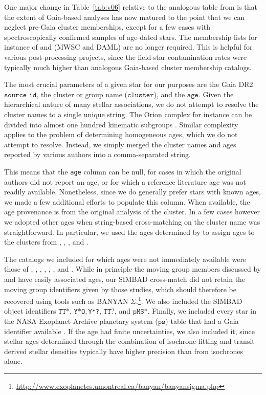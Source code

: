 \documentclass[12pt,modern,twocolumn,tighten]{aastex63}
\begin{document}
One major change in Table~\ref{tab:v06} relative to the analogous
table from \citet{bouma_cdipsI_2019} is that the extent of Gaia-based
analyses has now matured to the point that we can neglect pre-Gaia
cluster memberships, except for a few cases with spectroscopically
confirmed samples of age-dated stars.  The membership lists for
instance of \citet{Kharchenko_et_al_2013} and \citet{dias_proper_2014}
(MWSC and DAML) are no longer required.  This is helpful for various
post-processing projects,  since the field-star contamination rates
were typically much higher than analogous Gaia-based cluster membership
catalogs.

The most crucial parameters of a given star for our purposes are the
Gaia DR2 $\texttt{source\_id}$, the cluster or
group name ($\texttt{cluster}$), and the $\texttt{age}$.  Given the
hierarchical nature of many stellar associations, we do not attempt to
resolve the cluster names to a single unique string.  The Orion
complex for instance can be divided into almost one hundred kinematic
subgroups \citep{kounkel_apogee2_2018}.  Similar complexity applies to
the problem of determining homogeneous ages, which we do not attempt
to resolve.  Instead, we simply merged the cluster names and ages
reported by various authors into a comma-separated string.

This means that the \texttt{age} column can be null, for cases in
which the original authors did not report an age, or for which a reference
literature age was not readily available.  Nonetheless, since we do
generally prefer stars with known ages, we made a few additional
efforts to populate this column.  When available, the age provenance
is from the original analysis of the cluster.  In a few cases
however we adopted other ages when string-based cross-matching on the
cluster name was straightforward.  In particular, we used the ages
determined by \citet{CantatGaudin2020b} to assign ages to the clusters
from \citet{GaiaCollaboration2018}, \citet{CantatGaudin2018a},
\citet{CastroGinard2020}, and \citet{CantatGaudin2020a}.

The catalogs we included for which ages were not immediately available
were those of \citet{CottenSong2016}, \citet{Oh2017},
\citet{Zari2018}, \citet{Gagne2018b}, \citet{Gagne2018a},
\citet{Gagne2018c}, and \citet{Ujjwal2020}.  While in principle the
moving group members discussed by
\citet{Gagne2018b,Gagne2018a,Gagne2018c} and \citet{Ujjwal2020} have
easily associated ages, our SIMBAD cross-match did not retain the
moving group identifiers given by those studies, which should
therefore be recovered using tools such as BANYAN
$\Sigma$.\footnote{\url{http://www.exoplanetes.umontreal.ca/banyan/banyansigma.php}}.
We also included the SIMBAD object identifiers $\texttt{TT*}$,
$\texttt{Y*O}, $\texttt{Y*?}, $\texttt{TT?}$, and $\texttt{pMS*}$.
Finally, we  included every star in the NASA Exoplanet Archive
planetary system ($\texttt{ps}$) table that had a Gaia identifier
available \citep{NASAExoArchive_ps_20210506}.  If the age had finite
uncertainties, we also included it, since stellar ages determined
through the combination of isochrone-fitting and transit-derived
stellar densities typically have higher precision than from isochrones
alone.
\end{document}
